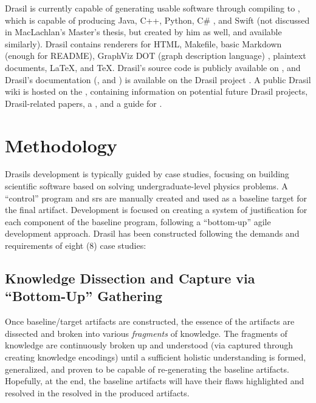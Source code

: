 Drasil is currently capable of generating usable software through compiling to
, which is capable of producing Java, C++, Python, C\#
\cite{MacLachlan2020}, and Swift (not discussed in MacLachlan's Master's thesis,
but created by him as well, and available similarly). Drasil contains renderers
for HTML, Makefile, basic Markdown (enough for README), GraphViz DOT (graph
description language) \cite{Gansner1993}, plaintext documents, \LaTeX{}, and
\TeX{}. Drasil's source code is publicly available on
, and Drasil's
documentation
(,
and
)
is available on the Drasil project
. A public Drasil
wiki is hosted on the , containing information
on potential future Drasil projects, Drasil-related papers, a
, and a
guide for .

\section{Methodology}

Drasils development is typically guided by case studies, focusing on building
scientific software based on solving undergraduate-level physics problems. A
``control'' program and \acs{srs} are manually created and used as a baseline
target for the final artifact. Development is focused on creating a system of
justification for each component of the baseline program, following a
``bottom-up'' agile  development approach. Drasil has
been constructed following the demands and requirements of eight (8) case
studies:

\caseStudiesTable

\subsection{Knowledge Dissection and Capture via ``Bottom-Up'' Gathering}

Once baseline/target artifacts are constructed, the essence of the artifacts are
dissected and broken into various \textit{fragments} of knowledge. The fragments
of knowledge are continuously broken up and understood (via captured through
creating knowledge encodings) until a sufficient holistic understanding is
formed, generalized, and proven to be capable of re-generating the baseline
artifacts. Hopefully, at the end, the baseline artifacts will have their flaws
highlighted and resolved in the resolved in the produced artifacts.

